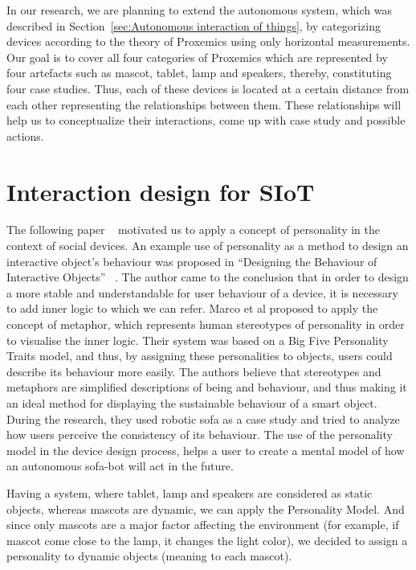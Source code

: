 In our research, we are planning to extend the autonomous system, which was
described in Section~\ref{sec:Autonomous interaction of things}, by categorizing devices
according to the theory of Proxemics using only horizontal measurements.
Our goal is to cover all four categories of Proxemics which are represented by four
artefacts such as mascot, tablet, lamp and speakers, thereby, constituting four case studies.
Thus, each of these devices is located at a certain distance from each other representing
the relationships between them.
These relationships will help us to conceptualize their interactions, come up with case study and possible actions.

\section{Interaction design for SIoT}
\label{sec:Interaction design for SIoT}

The following paper ~\cite{soro2018social} motivated us to apply a concept of
personality in the context of social devices.
An example use of personality as a method to design an interactive object’s behaviour
was proposed in “Designing the Behaviour of Interactive Objects” ~\cite{spadafora2016designing}.
The author came to the conclusion that in order to design a more stable and understandable
for user behaviour of a device, it is necessary to add inner logic to which we can refer.
Marco et al proposed to apply the concept of metaphor, which represents human stereotypes
of personality in order to visualise the inner logic.
Their system was based on a Big Five Personality Traits model, and thus,
by assigning these personalities to objects, users could describe its behaviour more easily.
The authors believe that stereotypes and metaphors are simplified descriptions of being and behaviour,
and thus making it an ideal method for displaying the sustainable behaviour of a smart object.
During the research, they used robotic sofa as a case study and tried to analyze how
users perceive the consistency of its behaviour.
The use of the personality model in the device design process, helps a user to create
a mental model of how an autonomous sofa-bot will act in the future.

Having a system, where tablet, lamp and speakers are considered as static objects,
whereas mascots are dynamic, we can apply the Personality Model.
And since only mascots are a major factor affecting the environment
(for example, if mascot come close to the lamp, it changes the light color), we decided to
assign a personality to dynamic objects (meaning to each mascot).

